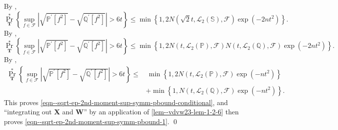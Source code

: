By ,
\begin{equation*}
  \Pr_{\mathbf{T}}^{\ast} \left\{ \sup_{f \in \mathcal{F}} \left|
  \sqrt{\mathbb{P}^{\prime} \left[ f^{2} \right]} - \sqrt{\mathbb{Q}^{\prime}
  \left[ f^{2} \right]} \right| > 6 t \right\} \leq \min \left\{ 1, 2 N \left(
  \sqrt{2} t, \mathscr{L}_{2} (\mathbb{S}), \mathcal{F} \right) \exp \left( -
  2 n t^{2} \right) \right\}.
\end{equation*}
By ,
\begin{equation*}
  \Pr_{\mathbf{T}}^{\ast} \left\{ \sup_{f \in \mathcal{F}} \left|
  \sqrt{\mathbb{P}^{\prime} \left[ f^{2} \right]} - \sqrt{\mathbb{Q}^{\prime}
  \left[ f^{2} \right]} \right| > 6 t \right\} \leq \min \left\{ 1, 2 N \left(
  t, \mathscr{L}_{2} (\mathbb{P}), \mathcal{F} \right) N \left( t,
  \mathscr{L}_{2} (\mathbb{Q}), \mathcal{F} \right) \exp \left( - 2 n t^{2}
  \right) \right\}.
\end{equation*}
By ,
\begin{equation*}
  \begin{split}
    \Pr_{\mathbf{T}}^{\ast} \left\{ \sup_{f \in \mathcal{F}} \left|
    \sqrt{\mathbb{P}^{\prime} \left[ f^{2} \right]} - \sqrt{\mathbb{Q}^{\prime}
    \left[ f^{2} \right]} \right| > 6 t \right\} \leq
    & \, \min \left\{ 1, 2 N \left( t, \mathscr{L}_{2} (\mathbb{P}), \mathcal{F}
    \right) \exp \left( - n t^{2} \right) \right\} \\
    & + \min \left\{ 1, N \left( t, \mathscr{L}_{2} (\mathbb{Q}), \mathcal{F}
    \right) \exp \left( - n t^{2} \right) \right\}.
  \end{split}
\end{equation*}
This proves \eqref{eqn--sqrt-ep-2nd-moment-sup-symm-pbound-conditional}, and
``integrating out \(\mathbf{X}\) and \(\mathbf{W}\)'' by an application of
\eqref{lem--vdvw23-lem-1-2-6} then proves
\eqref{eqn--sqrt-ep-2nd-moment-sup-symm-pbound-1}.
\qed

